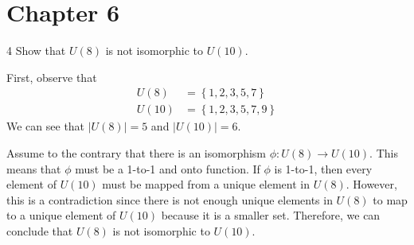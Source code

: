 \section*{Chapter 6}

\begin{hwproblem}
{4}{
    Show that \(U(8)\) is not isomorphic to \(U(10)\).
}

First, observe that
\[
\begin{aligned}
    U(8) &= \left\{1, 2, 3, 5, 7\right\} \\
    U(10) &= \left\{1, 2, 3, 5, 7, 9\right\}
\end{aligned}
\]
We can see that \(|U(8)| = 5\) and \(|U(10)| = 6\). 

Assume to the contrary that there is an isomorphism \(\phi : U(8) \to U(10)\). This means that \(\phi\) must be a 1-to-1 and onto function. If \(\phi\) is 1-to-1, then every element of \(U(10)\) must be mapped from a unique element in \(U(8)\). However, this is a contradiction since there is not enough unique elements in \(U(8)\) to map to a unique element of \(U(10)\) because it is a smaller set. Therefore, we can conclude that \(U(8)\) is not isomorphic to \(U(10)\).
\end{hwproblem}

